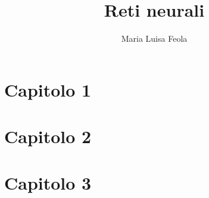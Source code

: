 \documentclass[12pt,a4paper,oneside]{book}
\author{Maria Luisa Feola}
\title{Reti neurali}
\begin{document}
	\chapter{Capitolo 1}
	\chapter{Capitolo 2}
	\chapter{Capitolo 3}
\end{document}
